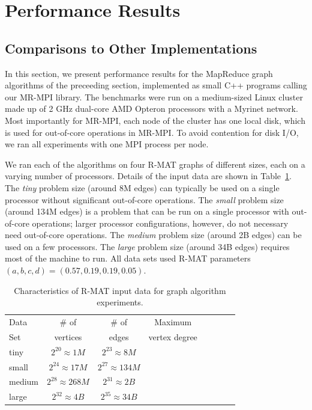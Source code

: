 \section{Performance Results}
\label{sec:results}

\subsection{Comparisons to Other Implementations}

In this section, we present performance results for the MapReduce
graph algorithms of the preceeding section, implemented as small C++
programs calling our MR-MPI library.
The benchmarks were run on a medium-sized Linux cluster made up of 2 GHz
dual-core AMD Opteron processors with a Myrinet network.  Most importantly
for MR-MPI, each node of the cluster has one local disk, which is used
for out-of-core operations in MR-MPI.  To avoid contention for disk I/O, we 
ran all experiments with one MPI process per node.

We ran each of the algorithms on four R-MAT graphs of
different sizes, each on a varying number of processors.  Details of the
input data are shown in Table~\ref{t:rmats}.
The {\it tiny} problem size (around 8M edges) can typically be used
on a single processor without significant out-of-core operations.
The {\it small} problem size (around 134M edges) is a 
problem that can be run
on a single processor with out-of-core operations; larger processor 
configurations, however, do not necessary need out-of-core operations.
The {\it medium} problem size (around 2B
edges) can be used on a few processors.  The {\it large} problem size
(around 34B edges) requires most of the machine to run.
All data sets used R-MAT parameters $(a, b, c, d) = (0.57, 0.19, 0.19, 0.05)$.

\begin{table}
\begin{tabular}{|l|c|c|c|c|c|c|c|}
\hline
Data & \# of    & \# of & Maximum \\
Set  & vertices & edges & vertex degree\\
\hline
tiny   &$2^{20} \approx 1M$ & $2^{23} \approx 8M$ &   \\
small  &$2^{24} \approx 17M$ & $2^{27} \approx 134M$ &   \\
medium &$2^{28} \approx 268M$ & $2^{31} \approx 2B$&   \\
large  &$2^{32} \approx 4B$ & $2^{35} \approx 34B$ &   \\
\hline
\end{tabular}
\caption{Characteristics of R-MAT input data for graph algorithm
experiments.}
\label{t:rmats}
\end{table}

